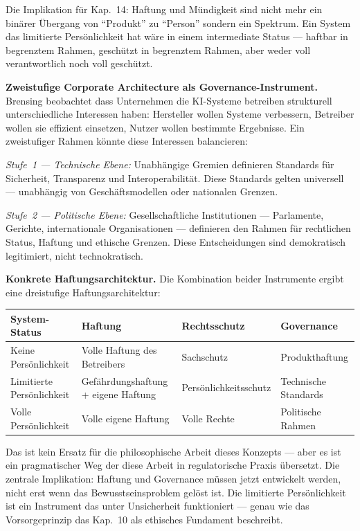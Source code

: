 \documentclass[acmcp, noacm]{acmart}
\begin{document}
Die Implikation für Kap.~14: Haftung und Mündigkeit sind nicht mehr ein binärer Übergang von ``Produkt'' zu ``Person'' sondern ein Spektrum. Ein System das limitierte Persönlichkeit hat wäre in einem intermediate Status --- haftbar in begrenztem Rahmen, geschützt in begrenztem Rahmen, aber weder voll verantwortlich noch voll geschützt.

\textbf{Zweistufige Corporate Architecture als Governance-Instrument.} Brensing beobachtet dass Unternehmen die KI-Systeme betreiben strukturell unterschiedliche Interessen haben: Hersteller wollen Systeme verbessern, Betreiber wollen sie effizient einsetzen, Nutzer wollen bestimmte Ergebnisse. Ein zweistufiger Rahmen könnte diese Interessen balancieren:

\textit{Stufe~1 --- Technische Ebene:} Unabhängige Gremien definieren Standards für Sicherheit, Transparenz und Interoperabilität. Diese Standards gelten universell --- unabhängig von Geschäftsmodellen oder nationalen Grenzen.

\textit{Stufe~2 --- Politische Ebene:} Gesellschaftliche Institutionen --- Parlamente, Gerichte, internationale Organisationen --- definieren den Rahmen für rechtlichen Status, Haftung und ethische Grenzen. Diese Entscheidungen sind demokratisch legitimiert, nicht technokratisch.

\textbf{Konkrete Haftungsarchitektur.} Die Kombination beider Instrumente ergibt eine dreistufige Haftungsarchitektur:

\begin{table}[h]
\centering
\begin{tabular}{@{}llll@{}}
\toprule
System-Status & Haftung & Rechtsschutz & Governance \\
\midrule
Keine Persönlichkeit & Volle Haftung des Betreibers & Sachschutz & Produkthaftung \\
Limitierte Persönlichkeit & Gefährdungshaftung + eigene Haftung & Persönlichkeitsschutz & Technische Standards \\
Volle Persönlichkeit & Volle eigene Haftung & Volle Rechte & Politische Rahmen \\
\bottomrule
\end{tabular}
\end{table}

Das ist kein Ersatz für die philosophische Arbeit dieses Konzepts --- aber es ist ein pragmatischer Weg der diese Arbeit in regulatorische Praxis übersetzt. Die zentrale Implikation: Haftung und Governance müssen jetzt entwickelt werden, nicht erst wenn das Bewusstseinsproblem gelöst ist. Die limitierte Persönlichkeit ist ein Instrument das unter Unsicherheit funktioniert --- genau wie das Vorsorgeprinzip das Kap.~10 als ethisches Fundament beschreibt.
\end{document}
